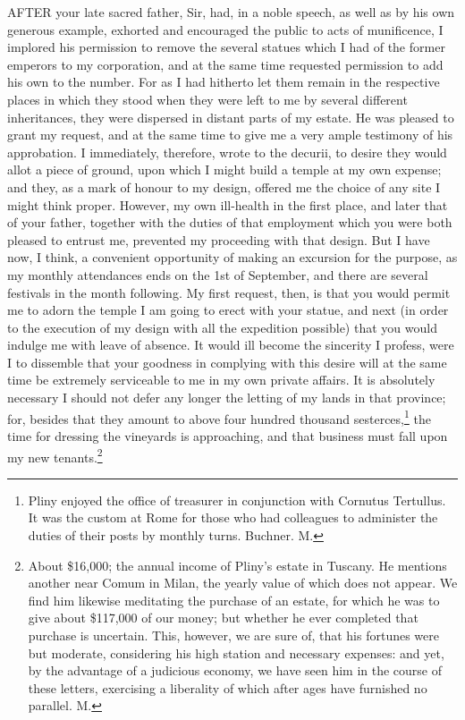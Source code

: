 
AFTER your late sacred father, Sir, had, in a noble speech, as well as by
his own generous example, exhorted and encouraged the public to acts of
munificence, I implored his permission to remove the several statues which
I had of the former emperors to my corporation, and at the same time
requested permission to add his own to the number. For as I had hitherto
let them remain in the respective places in which they stood when they
were left to me by several different inheritances, they were dispersed in
distant parts of my estate. He was pleased to grant my request, and at the
same time to give me a very ample testimony of his approbation. I
immediately, therefore, wrote to the decurii, to desire they would allot a
piece of ground, upon which I might build a temple at my own expense; and
they, as a mark of honour to my design, offered me the choice of any site
I might think proper. However, my own ill-health in the first place, and
later that of your father, together with the duties of that employment
which you were both pleased to entrust me, prevented my proceeding with
that design. But I have now, I think, a convenient opportunity of making
an excursion for the purpose, as my monthly attendances ends on the 1st of
September, and there are several festivals in the month following. My
first request, then, is that you would permit me to adorn the temple I am
going to erect with your statue, and next (in order to the execution of my
design with all the expedition possible) that you would indulge me with
leave of absence. It would ill become the sincerity I profess, were I to
dissemble that your goodness in complying with this desire will at the
same time be extremely serviceable to me in my own private affairs. It is
absolutely necessary I should not defer any longer the letting of my lands
in that province; for, besides that they amount to above four hundred
thousand sesterces,\footnote{Pliny enjoyed the
office of treasurer in conjunction with Cornutus Tertullus. It was the
custom at Rome for those who had colleagues to administer the duties of
their posts by monthly turns. Buchner. M.} the time for dressing the vineyards is
approaching, and that business must fall upon my new tenants.\footnote{About \$16,000; the
annual income of Pliny's estate in Tuscany. He mentions another near Comum
in Milan, the yearly value of which does not appear. We find him likewise
meditating the purchase of an estate, for which he was to give about
\$117,000 of our money; but whether he ever completed that purchase is
uncertain. This, however, we are sure of, that his fortunes were but
moderate, considering his high station and necessary expenses: and yet, by
the advantage of a judicious economy, we have seen him in the course of
these letters, exercising a liberality of which after ages have furnished
no parallel. M.}
